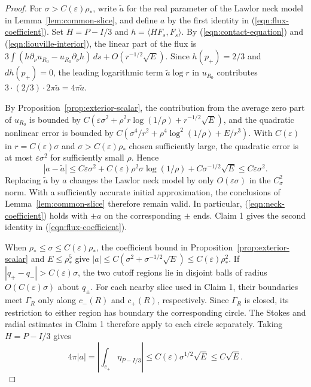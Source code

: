 \documentclass[11pt,a4paper]{article}
\numberwithin{equation}{section}
\theoremstyle{definition}
\theoremstyle{remark}
\begin{document}
	\begin{proof}
		For $\sigma>C(\varepsilon)\rho_*$, write $\tilde a$ for the real parameter of the
		Lawlor neck model in Lemma~\ref{lem:common-slice}, and define $a$ by the first
		identity in (\ref{eqn:flux-coefficient}).
		Set $H=P-I/3$ and $h=\langle HF_s,F_s\rangle$.
		By (\ref{eqn:contact-equation}) and (\ref{eqn:liouville-interior}),
		the linear part of the flux is
		$3\int(h\partial_\nu u_{R_0}-u_{R_0}\partial_\nu h)\,ds
		+O(r^{-1/2}\sqrt E)$.
		Since $h(p_+)=2/3$ and $dh(p_+)=0$, the leading logarithmic term
		$\tilde a\log r$ in $u_{R_0}$ contributes $3\cdot(2/3)\cdot2\pi\tilde a=4\pi\tilde a$.
		
		By Proposition~\ref{prop:exterior-scalar}, the contribution from the
		average zero part of $u_{R_0}$ is bounded by
		$C(\varepsilon\sigma^2+\rho^2r\log(1/\rho)+r^{-1/2}\sqrt E)$,
		and the quadratic nonlinear error is bounded by
		$C(\sigma^4/r^2+\rho^4\log^2(1/\rho)+E/r^3)$.
		With $C(\varepsilon)$ in $r=C(\varepsilon)\sigma$ and
		$\sigma>C(\varepsilon)\rho_*$ chosen sufficiently large,
		the quadratic error is at most $\varepsilon\sigma^2$
		for sufficiently small $\rho$. Hence
		\[
		|a-\tilde a|
		\le C\varepsilon\sigma^2+C(\varepsilon)\rho^2\sigma\log(1/\rho)
		+C\sigma^{-1/2}\sqrt E
		\le C\varepsilon\sigma^2.
		\]
		Replacing $\tilde a$ by $a$ changes the Lawlor neck model by only
		$O(\varepsilon\sigma)$ in the $C^2_\sigma$ norm. With a sufficiently accurate
		initial approximation, the conclusions of
		Lemma~\ref{lem:common-slice} therefore remain valid.
		In particular, (\ref{eqn:neck-coefficient}) holds with $\pm a$
		on the corresponding $\pm$ ends. Claim 1 gives the second identity in
		(\ref{eqn:flux-coefficient}).
		
		When $\rho_*\le\sigma\le C(\varepsilon)\rho_*$, the coefficient bound in
		Proposition~\ref{prop:exterior-scalar} and $E\le\rho_*^5$ give
		$|a|\le C(\sigma^2+\sigma^{-1/2}\sqrt E)\le C(\varepsilon)\rho_*^2$.
		If $|q_+-q_-|>C(\varepsilon)\sigma$, the two cutoff regions lie in disjoint balls
		of radius $O(C(\varepsilon)\sigma)$ about $q_\pm$.
		For each nearby slice used in Claim 1, their boundaries meet $\Gamma_R$
		only along $c_-(R)$ and $c_+(R)$, respectively.
		Since $\Gamma_R$ is closed, its restriction to either region has boundary
		the corresponding circle. The Stokes and radial estimates in Claim 1
		therefore apply to each circle separately. Taking $H=P-I/3$ gives
		\[
		4\pi|a|=\left|\int_{c_+}\eta_{P-I/3}\right|
		\le C(\varepsilon)\sigma^{1/2}\sqrt E\le C\sqrt E.
		\]
	\end{proof}
	
\end{document}
